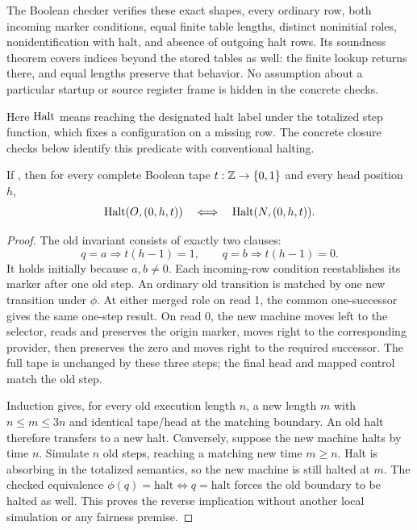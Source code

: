 The Boolean checker verifies these exact shapes, every ordinary row, both
incoming marker conditions, equal finite table lengths, distinct noninitial
roles, nonidentification with halt, and absence of outgoing halt rows. Its
soundness theorem covers indices beyond the stored tables as well: the
finite lookup returns  there, and equal lengths preserve that
behavior. No assumption about a particular startup or source register frame
is hidden in the concrete checks.

Here \(\operatorname{Halt}\) means reaching the designated halt label under the totalized
step function, which fixes a configuration on a missing row. The concrete
closure checks below identify this predicate with conventional halting.

\begin{theorem}
If , then for every complete
Boolean tape \(t:\mathbb{Z}\to\{0,1\}\) and every head position \(h\),
\[
 \operatorname{Halt}(O,(0,h,t))\quad\Longleftrightarrow\quad\operatorname{Halt}(N,(0,h,t)).
\]
\end{theorem}
\begin{proof}
The old invariant consists of exactly two clauses:
\[
 q=a\Longrightarrow t(h-1)=1,
 \qquad
 q=b\Longrightarrow t(h-1)=0.
\]
It holds initially because \(a,b\ne0\). Each incoming-row condition
reestablishes its marker after one old step. An ordinary old transition is
matched by one new transition under \(\phi\). At either merged role on
read 1, the common one-successor gives the same one-step result. On read 0,
the new machine moves left to the selector, reads and preserves the origin
marker, moves right to the corresponding provider, then preserves the zero
and moves right to the required successor. The full tape is unchanged by
these three steps; the final head and mapped control match the old step.

Induction gives, for every old execution length \(n\), a new length \(m\)
with \(n\le m\le3n\) and identical tape/head at the matching boundary.
An old halt therefore transfers to a new halt. Conversely, suppose the new
machine halts by time \(n\). Simulate \(n\) old steps, reaching a matching
new time \(m\ge n\). Halt is absorbing in the totalized semantics, so the
new machine is still halted at \(m\). The checked equivalence
\(\phi(q)=\mathrm{halt}\iff q=\mathrm{halt}\) forces the old boundary
to be halted as well. This proves the reverse implication without another
local simulation or any fairness premise.
\end{proof}

